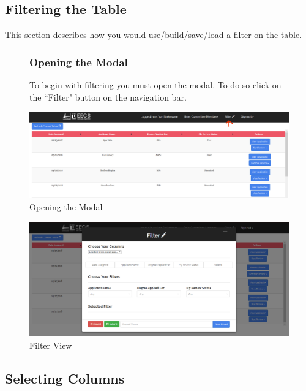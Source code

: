 \documentclass[fontsize=12pt,paper=letter,twoside]{scrartcl}
\begin{document}
\subsection{Filtering the Table}
This section describes how you would use/build/save/load a filter on the table.
\begin{figure}[!htb]
\subsubsection{Opening the Modal}
To begin with filtering you must open the modal. To do so click on the ``Filter" button on the navigation bar.
\begin{center}
\includegraphics[width=.99\textwidth]{images/open_modal.png}
\end{center}
\caption{Opening the  Modal}
\label{fig:open_modal}
\end{figure}
\clearpage

\begin{figure}[!htb]
\begin{center}
\includegraphics[width=.99\textwidth]{images/default_filter_view.png}
\end{center}
\caption{Filter View}
\label{fig:filter_view}
\end{figure}

\newpage
\subsection{Selecting Columns}
\end{document}
